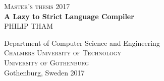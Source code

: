 \thispagestyle{empty}
\begin{center}
	\textsc{\large Master's thesis 2017}\\[4cm]		%
	\textbf{\Large A Lazy to Strict Language Compiler} \\[1cm]
	{\large PHILIP THAM}
	
	\vfill	
	
	Department of Computer Science and Engineering\\
	\textsc{Chalmers University of Technology} \\
  \textsc{University of Gothenburg} \\
	Gothenburg, Sweden 2017 \\
\end{center}
